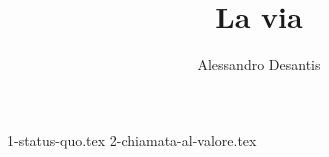 \documentclass[a4paper,oneside,11pt]{memoir}
\title{La via}
\author{Alessandro Desantis}
\date{}
\begin{document}
    \begin{titlingpage}
        \maketitle
    \end{titlingpage}


    {1-status-quo.tex}
    {2-chiamata-al-valore.tex}
\end{document}
